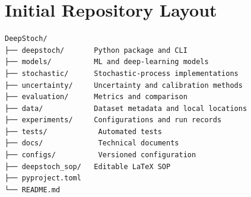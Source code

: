 \documentclass[11pt,a4paper]{report}
\begin{document}
\appendix
\chapter{Initial Repository Layout}
\begin{lstlisting}
DeepStoch/
├── deepstoch/       Python package and CLI
├── models/          ML and deep-learning models
├── stochastic/      Stochastic-process implementations
├── uncertainty/     Uncertainty and calibration methods
├── evaluation/      Metrics and comparison
├── data/            Dataset metadata and local locations
├── experiments/     Configurations and run records
├── tests/            Automated tests
├── docs/             Technical documents
├── configs/          Versioned configuration
├── deepstoch_sop/   Editable LaTeX SOP
├── pyproject.toml
└── README.md
\end{lstlisting}
\end{document}
